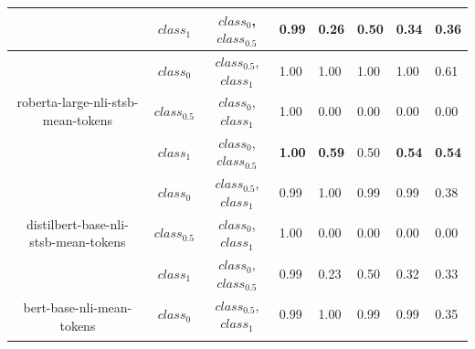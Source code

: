 \documentclass{ieeeaccess}
\begin{document}
\begin{table}[h!]
\begin{tabular}{|c|c|c|l|l|l|l|l|}
		& $class_1$                       & $class_0$,$class_{0.5}$                & 0.99                                   & 0.26                                    & 0.50                                 & 0.34                              & 0.36                              \\ \hline
		\multirow{3}{*}{roberta-large-nli-stsb-mean-tokens}   & $class_0$                     & $class_{0.5}$,$class_1$                   & 1.00                                   & 1.00                                    & 1.00                                 & 1.00                              & 0.61                              \\ \cline{2-8} 
		& $class_{0.5}$                     & $class_0$,$class_1$                   & 1.00                                   & 0.00                                    & 0.00                                 & 0.00                              & 0.00                              \\ \cline{2-8} 
		& $class_1$                       & $class_0$,$class_{0.5}$                & \textbf{1.00}                          & \textbf{0.59}                           & 0.50                                 & \textbf{0.54}                     & \textbf{0.54}                     \\ \hline
		\multirow{3}{*}{distilbert-base-nli-stsb-mean-tokens} & $class_0$                     & $class_{0.5}$,$class_1$                   & 0.99                                   & 1.00                                    & 0.99                                 & 0.99                              & 0.38                              \\ \cline{2-8} 
		& $class_{0.5}$                     & $class_0$,$class_1$                   & 1.00                                   & 0.00                                    & 0.00                                 & 0.00                              & 0.00                              \\ \cline{2-8} 
		& $class_1$                       & $class_0$,$class_{0.5}$                 & 0.99                                   & 0.23                                    & 0.50                                 & 0.32                              & 0.33                              \\ \hline
		\multirow{3}{*}{bert-base-nli-mean-tokens}            & $class_0$                     & $class_{0.5}$,$class_1$                   & 0.99                                   & 1.00                                    & 0.99                                 & 0.99                              & 0.35                              \\ \cline{2-8} 

\end{tabular}
\end{table}
\end{document}
